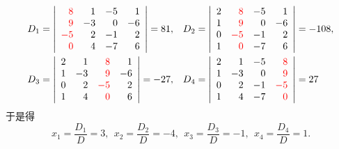 \begin{frame}

  $$
  \begin{aligned}
    D_1 = \left|
      \begin{array}{rrrr}
        \textcolor{red}{8}  &  1 & -5 &  1\\
        \textcolor{red}{9}  & -3 &  0 & -6\\
        \textcolor{red}{-5} &  2 & -1 &  2\\
        \textcolor{red}{0}  &  4 & -7 &  6
      \end{array}
    \right|= 81, & \quad
    D_2 = \left|
      \begin{array}{rrrr}
        2 & \textcolor{red}{8}  & -5 &  1\\
        1 & \textcolor{red}{9}  &  0 & -6\\
        0 & \textcolor{red}{-5} & -1 &  2\\
        1 & \textcolor{red}{0}  & -7 &  6
      \end{array}
    \right|=-108,\\
    D_3 = \left|
      \begin{array}{rrrr}
        2  &  1 & \textcolor{red}{8}  &  1\\
        1  & -3 & \textcolor{red}{9}  & -6\\
        0  &  2 & \textcolor{red}{-5} &  2\\
        1  &  4 & \textcolor{red}{0}  &  6
      \end{array}
    \right|= -27, & \quad
    D_4 = \left|
      \begin{array}{rrrr}
        2 &  1 & -5 & \textcolor{red}{8} \\
        1 & -3 &  0 & \textcolor{red}{9} \\
        0 &  2 & -1 & \textcolor{red}{-5}\\
        1 &  4 & -7 & \textcolor{red}{0} 
      \end{array}
    \right|= 27
  \end{aligned}
  $$
  于是得
  $$
  x_1 = \frac{D_1}D = 3,  \ \ 
  x_2 = \frac{D_2}D = -4, \ \ 
  x_3 = \frac{D_3}D = -1, \ \ 
  x_4 = \frac{D_4}D = 1.
  $$

\end{frame}

